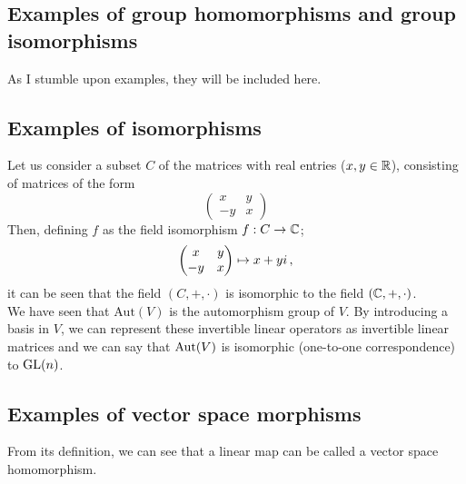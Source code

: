     \subsection{Examples of group homomorphisms and group isomorphisms}
        As I stumble upon examples, they will be included here.

    \subsection{Examples of isomorphisms}
        Let us consider a subset $C$ of the matrices with real entries ($x, y \in \mathbb{R}$), consisting of matrices of the form
        \begin{equation}
            \begin{pmatrix} x & y \\ -y & x \end{pmatrix}
        \end{equation}
        Then, defining $f$ as the field isomorphism $f: C \rightarrow \mathbb{C}$;
        \begin{equation}
            \begin{pmatrix} x & y \\ -y & x \end{pmatrix} \mapsto x + yi \thinspace ,
        \end{equation}
        it can be seen that the field $(C, +, \cdot)$ is isomorphic to the field $(\mathbb{C}, +, \cdot)$. \\

        We have seen that $\text{Aut}(V)$ is the automorphism group of $V$. By introducing a basis in $V$, we can represent these invertible linear operators as invertible linear matrices and we can say that $\operatorname{Aut}(V)$ is isomorphic (one-to-one correspondence) to $\operatorname{GL}(n)$. \\

    \subsection{Examples of vector space morphisms}
        From its definition, we can see that a linear map can be called a vector space homomorphism. \\
